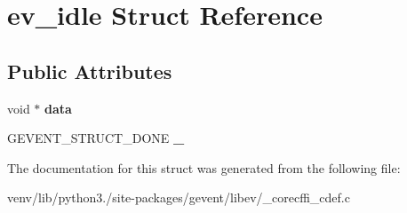 \hypertarget{structev__idle}{}\section{ev\+\_\+idle Struct Reference}
\label{structev__idle}
\subsection*{Public Attributes}
\begin{DoxyCompactItemize}
\item 
\mbox{\label{structev__idle_a7387f733dd76c0a55c68f04aa1fe6d14}} 
void $\ast$ {\bfseries data}
\item 
\mbox{\label{structev__idle_a7a3c9c99184a9d01105c0bacdd13d7e7}} 
G\+E\+V\+E\+N\+T\+\_\+\+S\+T\+R\+U\+C\+T\+\_\+\+D\+O\+NE {\bfseries \+\_\+}
\end{DoxyCompactItemize}


The documentation for this struct was generated from the following file\+:\begin{DoxyCompactItemize}
\item 
venv/lib/python3./site-\/packages/gevent/libev/\+\_\+corecffi\+\_\+cdef.\+c\end{DoxyCompactItemize}
